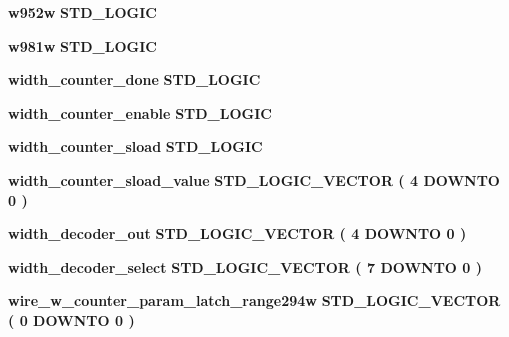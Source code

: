 \begin{DoxyCompactItemize}
\item 
{\bf w952w} {\bfseries \textcolor{comment}{S\+T\+D\+\_\+\+L\+O\+G\+IC}\textcolor{vhdlchar}{ }} 
\item 
{\bf w981w} {\bfseries \textcolor{comment}{S\+T\+D\+\_\+\+L\+O\+G\+IC}\textcolor{vhdlchar}{ }} 
\item 
{\bf width\+\_\+counter\+\_\+done} {\bfseries \textcolor{comment}{S\+T\+D\+\_\+\+L\+O\+G\+IC}\textcolor{vhdlchar}{ }} 
\item 
{\bf width\+\_\+counter\+\_\+enable} {\bfseries \textcolor{comment}{S\+T\+D\+\_\+\+L\+O\+G\+IC}\textcolor{vhdlchar}{ }} 
\item 
{\bf width\+\_\+counter\+\_\+sload} {\bfseries \textcolor{comment}{S\+T\+D\+\_\+\+L\+O\+G\+IC}\textcolor{vhdlchar}{ }} 
\item 
{\bf width\+\_\+counter\+\_\+sload\+\_\+value} {\bfseries \textcolor{comment}{S\+T\+D\+\_\+\+L\+O\+G\+I\+C\+\_\+\+V\+E\+C\+T\+OR}\textcolor{vhdlchar}{ }\textcolor{vhdlchar}{(}\textcolor{vhdlchar}{ }\textcolor{vhdlchar}{ } \textcolor{vhdldigit}{4} \textcolor{vhdlchar}{ }\textcolor{keywordflow}{D\+O\+W\+N\+TO}\textcolor{vhdlchar}{ }\textcolor{vhdlchar}{ } \textcolor{vhdldigit}{0} \textcolor{vhdlchar}{ }\textcolor{vhdlchar}{)}\textcolor{vhdlchar}{ }} 
\item 
{\bf width\+\_\+decoder\+\_\+out} {\bfseries \textcolor{comment}{S\+T\+D\+\_\+\+L\+O\+G\+I\+C\+\_\+\+V\+E\+C\+T\+OR}\textcolor{vhdlchar}{ }\textcolor{vhdlchar}{(}\textcolor{vhdlchar}{ }\textcolor{vhdlchar}{ } \textcolor{vhdldigit}{4} \textcolor{vhdlchar}{ }\textcolor{keywordflow}{D\+O\+W\+N\+TO}\textcolor{vhdlchar}{ }\textcolor{vhdlchar}{ } \textcolor{vhdldigit}{0} \textcolor{vhdlchar}{ }\textcolor{vhdlchar}{)}\textcolor{vhdlchar}{ }} 
\item 
{\bf width\+\_\+decoder\+\_\+select} {\bfseries \textcolor{comment}{S\+T\+D\+\_\+\+L\+O\+G\+I\+C\+\_\+\+V\+E\+C\+T\+OR}\textcolor{vhdlchar}{ }\textcolor{vhdlchar}{(}\textcolor{vhdlchar}{ }\textcolor{vhdlchar}{ } \textcolor{vhdldigit}{7} \textcolor{vhdlchar}{ }\textcolor{keywordflow}{D\+O\+W\+N\+TO}\textcolor{vhdlchar}{ }\textcolor{vhdlchar}{ } \textcolor{vhdldigit}{0} \textcolor{vhdlchar}{ }\textcolor{vhdlchar}{)}\textcolor{vhdlchar}{ }} 
\item 
{\bf wire\+\_\+w\+\_\+counter\+\_\+param\+\_\+latch\+\_\+range294w} {\bfseries \textcolor{comment}{S\+T\+D\+\_\+\+L\+O\+G\+I\+C\+\_\+\+V\+E\+C\+T\+OR}\textcolor{vhdlchar}{ }\textcolor{vhdlchar}{(}\textcolor{vhdlchar}{ }\textcolor{vhdlchar}{ } \textcolor{vhdldigit}{0} \textcolor{vhdlchar}{ }\textcolor{keywordflow}{D\+O\+W\+N\+TO}\textcolor{vhdlchar}{ }\textcolor{vhdlchar}{ } \textcolor{vhdldigit}{0} \textcolor{vhdlchar}{ }\textcolor{vhdlchar}{)}\textcolor{vhdlchar}{ }} 

\end{DoxyCompactItemize}
